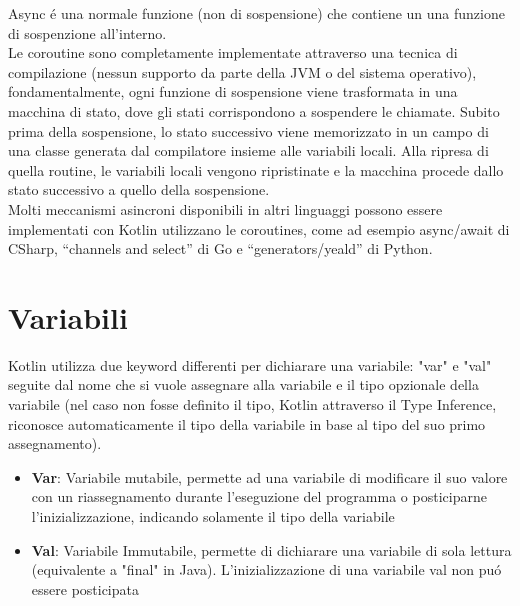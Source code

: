 Async \'e una normale funzione (non di sospensione) che contiene un una funzione di sospenzione all'interno.\\
Le coroutine sono completamente implementate attraverso una tecnica di compilazione (nessun supporto da parte della JVM o del sistema operativo), fondamentalmente, ogni funzione di sospensione viene trasformata in una macchina di stato, dove gli stati corrispondono a sospendere le chiamate. Subito prima della sospensione, lo stato successivo viene memorizzato in un campo di una classe generata dal compilatore insieme alle variabili locali. Alla ripresa di quella routine, le variabili locali vengono ripristinate e la macchina procede dallo stato successivo a quello della sospensione.\\
Molti meccanismi asincroni disponibili in altri linguaggi possono essere implementati con Kotlin utilizzano le coroutines, come ad esempio async/await di CSharp, ``channels and select'' di Go e ``generators/yeald'' di Python.


\section{Variabili}
Kotlin utilizza due keyword differenti per dichiarare una variabile: "var" e "val" seguite dal nome che si vuole assegnare alla variabile e il tipo opzionale della variabile (nel caso non fosse definito il tipo, Kotlin attraverso il Type Inference, riconosce automaticamente il tipo della variabile in base al tipo del suo primo assegnamento).

\begin{itemize}                         %
\item \textbf{Var}: Variabile mutabile, permette ad una variabile di modificare il suo valore con un riassegnamento durante l'eseguzione del programma o posticiparne l'inizializzazione, indicando solamente il tipo della variabile
\item \textbf{Val}: Variabile Immutabile, permette di dichiarare una variabile di sola lettura (equivalente a "final" in Java). L'inizializzazione di una variabile val non pu\'o essere posticipata
\end{itemize}


